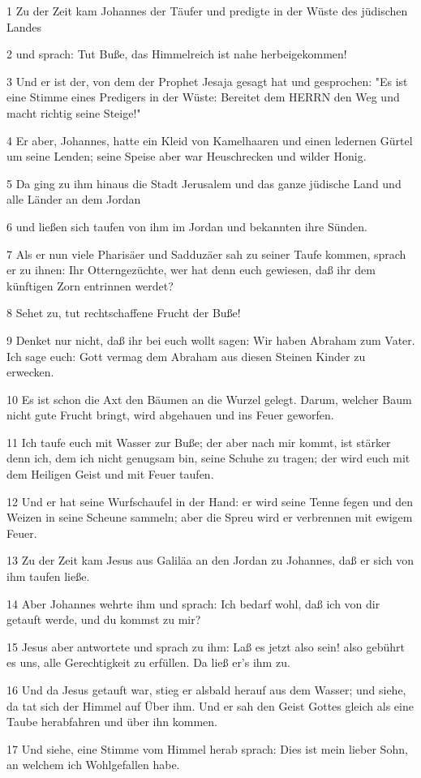 \par 1 Zu der Zeit kam Johannes der Täufer und predigte in der Wüste des jüdischen Landes
\par 2 und sprach: Tut Buße, das Himmelreich ist nahe herbeigekommen!
\par 3 Und er ist der, von dem der Prophet Jesaja gesagt hat und gesprochen: "Es ist eine Stimme eines Predigers in der Wüste: Bereitet dem HERRN den Weg und macht richtig seine Steige!"
\par 4 Er aber, Johannes, hatte ein Kleid von Kamelhaaren und einen ledernen Gürtel um seine Lenden; seine Speise aber war Heuschrecken und wilder Honig.
\par 5 Da ging zu ihm hinaus die Stadt Jerusalem und das ganze jüdische Land und alle Länder an dem Jordan
\par 6 und ließen sich taufen von ihm im Jordan und bekannten ihre Sünden.
\par 7 Als er nun viele Pharisäer und Sadduzäer sah zu seiner Taufe kommen, sprach er zu ihnen: Ihr Otterngezüchte, wer hat denn euch gewiesen, daß ihr dem künftigen Zorn entrinnen werdet?
\par 8 Sehet zu, tut rechtschaffene Frucht der Buße!
\par 9 Denket nur nicht, daß ihr bei euch wollt sagen: Wir haben Abraham zum Vater. Ich sage euch: Gott vermag dem Abraham aus diesen Steinen Kinder zu erwecken.
\par 10 Es ist schon die Axt den Bäumen an die Wurzel gelegt. Darum, welcher Baum nicht gute Frucht bringt, wird abgehauen und ins Feuer geworfen.
\par 11 Ich taufe euch mit Wasser zur Buße; der aber nach mir kommt, ist stärker denn ich, dem ich nicht genugsam bin, seine Schuhe zu tragen; der wird euch mit dem Heiligen Geist und mit Feuer taufen.
\par 12 Und er hat seine Wurfschaufel in der Hand: er wird seine Tenne fegen und den Weizen in seine Scheune sammeln; aber die Spreu wird er verbrennen mit ewigem Feuer.
\par 13 Zu der Zeit kam Jesus aus Galiläa an den Jordan zu Johannes, daß er sich von ihm taufen ließe.
\par 14 Aber Johannes wehrte ihm und sprach: Ich bedarf wohl, daß ich von dir getauft werde, und du kommst zu mir?
\par 15 Jesus aber antwortete und sprach zu ihm: Laß es jetzt also sein! also gebührt es uns, alle Gerechtigkeit zu erfüllen. Da ließ er's ihm zu.
\par 16 Und da Jesus getauft war, stieg er alsbald herauf aus dem Wasser; und siehe, da tat sich der Himmel auf Über ihm. Und er sah den Geist Gottes gleich als eine Taube herabfahren und über ihn kommen.
\par 17 Und siehe, eine Stimme vom Himmel herab sprach: Dies ist mein lieber Sohn, an welchem ich Wohlgefallen habe.


